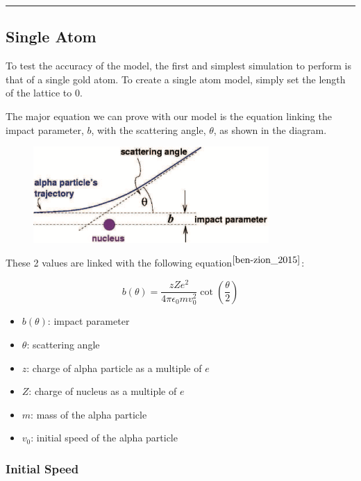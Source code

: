 \documentclass[11pt]{article}
\begin{document}
\begin{center}\rule{0.5\linewidth}{0.5pt}\end{center}

\hypertarget{single-atom}{%
\subsection{Single Atom}\label{single-atom}}

To test the accuracy of the model, the first and simplest simulation to
perform is that of a single gold atom. To create a single atom model,
simply set the length of the lattice to 0.

The major equation we can prove with our model is the equation linking
the impact parameter, \(b\), with the scattering angle, \(\theta\), as
shown in the diagram.

\quad
\begin{figure}[!ht]
	\centering
	\includegraphics[width=0.8\textwidth]{../images/impactParam.png}
\end{figure}

These 2 values are linked with the following equation$^{\cite{ben-zion_2015}}$:

\[ b(\theta) = \frac{zZe^{2}}{4\pi \epsilon_{0} mv_{0}^{2}}\cot(\frac{\theta}{2}) \]

\begin{itemize}
	\item \(b(\theta)\): impact parameter
	\item \(\theta\): scattering angle
	\item \(z\): charge of alpha particle as a multiple of \(e\)
	\item \(Z\): charge of nucleus as a multiple of \(e\)
	\item \(m\): mass of the alpha particle
	\item \(v_{0}\): initial speed of the alpha particle
\end{itemize}

\hypertarget{initial-speed}{%
\subsubsection*{Initial Speed}\label{initial-speed}}
\end{document}
